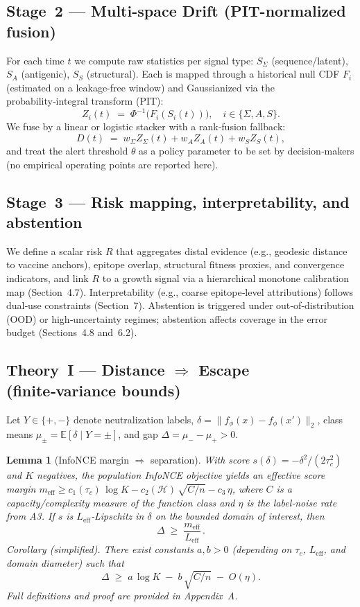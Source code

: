 \documentclass[11pt]{article}
\newtheorem{lemma}{Lemma}
\begin{document}
\subsection{Stage 2 — Multi-space Drift (PIT-normalized fusion)}
For each time $t$ we compute raw statistics per signal type: $S_\Sigma$ (sequence/latent), $S_A$ (antigenic), $S_S$ (structural). Each is mapped through a historical null CDF $F_i$ (estimated on a leakage-free window) and Gaussianized via the probability‑integral transform (PIT):
\begin{equation}
Z_i(t) \;=\; \Phi^{-1}\!\big(F_i(S_i(t))\big),\quad i\in\{\Sigma,A,S\}.
\end{equation}
We fuse by a linear or logistic stacker with a rank‑fusion fallback:
\begin{equation}
D(t) \;=\; w_\Sigma Z_\Sigma(t) + w_A Z_A(t) + w_S Z_S(t),
\end{equation}
and treat the alert threshold $\theta$ as a policy parameter to be set by decision‑makers (no empirical operating points are reported here).

\subsection{Stage 3 — Risk mapping, interpretability, and abstention}
We define a scalar risk $R$ that aggregates distal evidence (e.g., geodesic distance to vaccine anchors), epitope overlap, structural fitness proxies, and convergence indicators, and link $R$ to a growth signal via a hierarchical monotone calibration map (Section~4.7). Interpretability (e.g., coarse epitope‑level attributions) follows dual‑use constraints (Section~7). Abstention is triggered under out‑of‑distribution (OOD) or high‑uncertainty regimes; abstention affects coverage in the error budget (Sections~4.8 and 6.2).

\subsection{Theory I — Distance $\Rightarrow$ Escape (finite‑variance bounds)}
Let $Y\in\{+,-\}$ denote neutralization labels, $\delta=\|f_\phi(x)-f_\phi(x')\|_2$, class means $\mu_\pm=\mathbb{E}[\delta\mid Y=\pm]$, and gap $\Delta=\mu_--\mu_+>0$.

\begin{lemma}[InfoNCE margin $\Rightarrow$ separation]
\label{lem:margin}
With score $s(\delta)=-\delta^2/(2\tau_c^2)$ and $K$ negatives, the population InfoNCE objective yields an effective score margin $m_{\mathrm{eff}}\!\ge\!c_1(\tau_c)\,\log K - c_2(\mathcal{H})\,\sqrt{C/n} - c_3\,\eta$, where $C$ is a capacity/complexity measure of the function class and $\eta$ is the label‑noise rate from A3. If $s$ is $L_{\mathrm{eff}}$‑Lipschitz in $\delta$ on the bounded domain of interest, then
\[
\Delta \;\ge\; \frac{m_{\mathrm{eff}}}{L_{\mathrm{eff}}}\,.
\]
\emph{Corollary (simplified).} There exist constants $a,b>0$ (depending on $\tau_c$, $L_{\mathrm{eff}}$, and domain diameter) such that
\[
\Delta \;\ge\; a\,\log K \;-\; b\,\sqrt{C/n}\;-\;O(\eta).
\]
Full definitions and proof are provided in Appendix~A.
\end{lemma}
\end{document}
